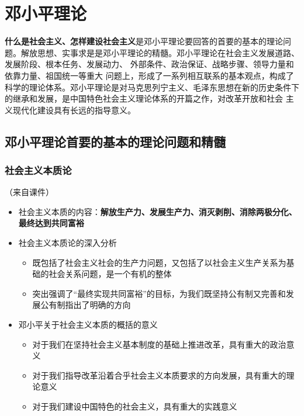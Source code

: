 \documentclass[12pt,openany]{ctexbook}
\begin{document}
\chapter{邓小平理论}
\textbf{什么是社会主义、怎样建设社会主义}是邓小平理论要回答的首要的基本的理论问题。解放思想、实事求是是邓小平理论的精髓。邓小平理论在社会主义发展道路、发展阶段、根本任务、发展动力、 外部条件、政治保证、战略步骤、领导力量和依靠力量、祖国统一等重大 问题上，形成了一系列相互联系的基本观点，构成了科学的理论体系。邓小平理论是对马克思列宁主义、毛泽东思想在新的历史条件下的继承和发展，是中国特色社会主义理论体系的开篇之作，对改革开放和社会 主义现代化建设具有长远的指导意义。
\section{邓小平理论首要的基本的理论问题和精髓}
\subsection{社会主义本质论}
（来自课件）
\begin{itemize}
  \item 社会主义本质的内容：\textbf{解放生产力、发展生产力、消灭剥削、消除两极分化、最终达到共同富裕}
  \item 社会主义本质论的深入分析
\begin{itemize}
  \item 既包括了社会主义社会的生产力问题，又包括了以社会主义生产关系为基础的社会关系问题，是一个有机的整体
  \item 突出强调了“最终实现共同富裕”的目标，为我们既坚持公有制又完善和发展公有制指出了明确的方向
\end{itemize}
  \item 邓小平关于社会主义本质的概括的意义
\begin{itemize}
  \item 对于我们在坚持社会主义基本制度的基础上推进改革，具有重大的政治意义
  \item 对于我们指导改革沿着合乎社会主义本质要求的方向发展，具有重大的理论意义
  \item 对于我们建设中国特色的社会主义，具有重大的实践意义
\end{itemize}
\end{itemize}
\end{document}

